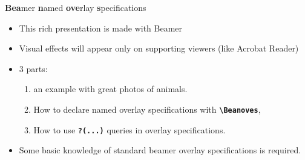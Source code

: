 \begin{center}
\Large
\textbf{Bea}mer \textbf{n}amed \textbf{ove}rlay \textbf{s}pecifications
\end{center}
\vspace{0.5\baselineskip}
\begin{itemize}
\item
This rich presentation is made with Beamer
\item
Visual effects will appear only on supporting viewers (like Acrobat Reader)
\item
3 parts:
\begin{enumerate}
\item
an example with great photos of animals.
\item
How to declare named overlay specifications with \texttt{\bfseries\color{MyGreen}\backslash Beanoves},
\item
How to use \texttt{\bfseries\color{MyGreen}?(...)} queries in overlay specifications.
\end{enumerate}
\item
Some basic knowledge of standard beamer overlay specifications is required.
\end{itemize}
